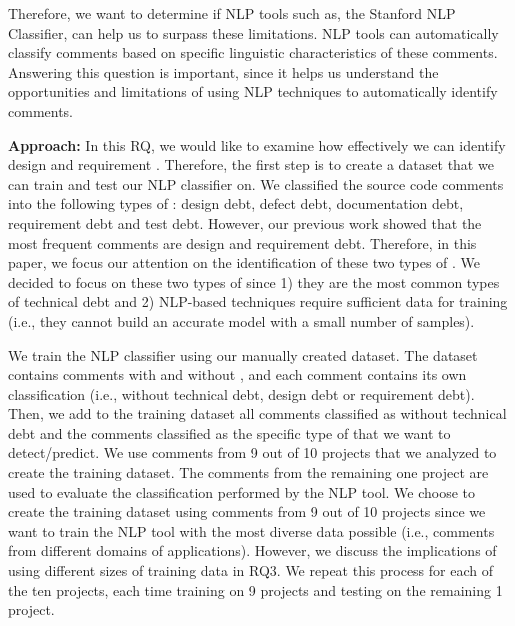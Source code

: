 Therefore, we want to determine if NLP tools such as, the Stanford NLP Classifier, can help us to surpass these limitations. NLP tools can automatically classify comments based on specific linguistic characteristics of these comments. Answering this question is important, since it helps us understand the opportunities and limitations of using NLP techniques to automatically identify \SATD comments. 



\vspace{1mm}
\noindent \textbf{Approach:} In this RQ, we would like to examine how effectively we can identify design and requirement \SATD. Therefore, the first step is to create a dataset that we can train and test our NLP classifier on. We classified the source code comments into the following types of \SATD: design debt, defect debt, documentation debt, requirement debt and test debt. However, our previous work showed that the most frequent \SATD comments are design and requirement debt. Therefore, in this paper, we focus our attention on the identification of these two types of \SATD. We decided to focus on these two types of \SATD since 1) they are the most common types of technical debt and 2) NLP-based techniques require sufficient data for training (i.e., they cannot build an accurate model with a small number of samples).


We train the NLP classifier using our manually created dataset. The dataset contains comments with and without \SATD, and each comment contains its own classification (i.e., without technical debt, design debt or requirement debt). Then, we add to the training dataset all comments classified as without technical debt and the comments classified as the specific type of \SATD that we want to detect/predict. We use comments from 9 out of 10 projects that we analyzed to create the training dataset. The comments from the remaining one project are used to evaluate the classification performed by the NLP tool. We choose to create the training dataset using comments from 9 out of 10 projects since we want to train the NLP tool with the most diverse data possible (i.e., comments from different domains of applications). However, we discuss the implications of using different sizes of training data in RQ3. We repeat this process for each of the ten projects, each time training on 9 projects and testing on the remaining 1 project.


